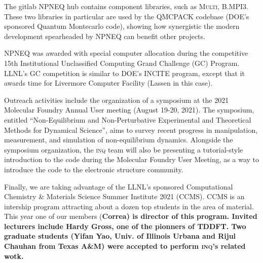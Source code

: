 The gitlab NPNEQ hub contains component libraries, such as \textsc{Multi}, \textsc{B.MPI3}.
These two libraries in particular are used by the QMCPACK codebase (DOE's sponsored Quantum Montecarlo code), showing how synergistic the modern development spearheaded by NPNEQ can benefit other projects.

NPNEQ was awarded with special computer allocation during the competitive 15th
Institutional Unclassified Computing Grand Challenge (GC) Program.
LLNL's GC competition is similar to DOE's INCITE program, except that it awards time for Livermore Computer Facility (Lassen in this case).

Outreach activities include the organization of a symposium at the 2021 Molecular Foundry Annual User meeting (August 19-20, 2021). 
The symposium, entitled ``Non-Equilibrium and Non-Perturbative Experimental and Theoretical Methods for Dynamical Science'', aims to survey recent progress in manipulation, measurement, and simulation of non-equilibrium dynamics.
Alongside the symposium organization, the \textsc{inq} team will also be presenting a tutorial-style introduction to the code during the Molecular Foundry User Meeting, as a way to introduce the code to the electronic structure community.

Finally, we are taking advantage of the LLNL's sponsored Computational Chemistry \& Materials Science Summer Institute 2021 (CCMS).
CCMS is an intership program attracting about a dozen top students in the area of material.
This year one of our members (\bf Correa) is director of this program.
Invited lecturers include Hardy Gross, one of the pionners of TDDFT.
Two graduate students (Yifan Yao, Univ. of Illinois Urbana and Rijul Chauhan from Texas A\&M) were accepted to perform \textsc{inq}'s related wotk.

\clearpage

